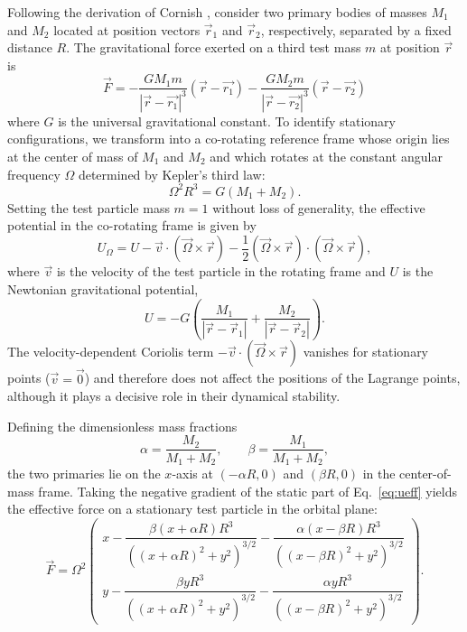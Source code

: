 \documentclass[12pt, letterpaper]{article}
\begin{document}
Following the derivation of Cornish \cite{cornish}, consider two primary bodies of masses $M_1$ and $M_2$ located at position vectors $\vec{r}_1$ and $\vec{r}_2$, respectively, separated by a fixed distance $R$. The gravitational force exerted on a third test mass $m$ at position $\vec{r}$ is
$$ 
\vec{F}
= -\frac{GM_1m}{|\vec{r}-\vec{r_1}|^3} (\vec{r}-\vec{r_1})
-\frac{GM_2m}{|\vec{r}-\vec{r_2}|^3} (\vec{r}-\vec{r_2})
$$
where $G$ is the universal gravitational constant. To identify stationary configurations, we transform into a co-rotating reference frame whose origin lies at the center of mass of $M_1$ and $M_2$ and which rotates at the constant angular frequency $\Omega$ determined by Kepler's third law:
$$
\Omega^2 R^3 = G(M_1 + M_2).
$$
Setting the test particle mass $m = 1$ without loss of generality, the effective potential in the co-rotating frame is given by
\begin{equation}
U_\Omega = U - 
\vec{v} \cdot (\vec{\Omega} \times \vec{r}) -
\frac{1}{2}(\vec{\Omega} \times \vec{r})\cdot(\vec{\Omega} \times \vec{r}),
\label{eq:ueff}
\end{equation}
where $\vec{v}$ is the velocity of the test particle in the rotating frame and $U$ is the Newtonian gravitational potential,
$$
U = -G\left(\frac{M_1}{|\vec{r} - \vec{r}_1|} + \frac{M_2}{|\vec{r} - \vec{r}_2|}\right).
$$
The velocity-dependent Coriolis term $-\vec{v} \cdot (\vec{\Omega} \times \vec{r})$ vanishes for stationary points ($\vec{v} = \vec{0}$) and therefore does not affect the positions of the Lagrange points, although it plays a decisive role in their dynamical stability.

Defining the dimensionless mass fractions
$$
\alpha = \frac{M_2}{M_1 + M_2}, \qquad \beta = \frac{M_1}{M_1 + M_2},
$$
the two primaries lie on the $x$-axis at $(-\alpha R, 0)$ and $(\beta R, 0)$ in the center-of-mass frame. Taking the negative gradient of the static part of Eq.~\eqref{eq:ueff} yields the effective force on a stationary test particle in the orbital plane:
\begin{equation}
\vec{F} = \Omega^2
\begin{pmatrix}
x - \dfrac{\beta(x + \alpha R)R^3}{\left((x + \alpha R)^2 + y^2\right)^{3/2}} - \dfrac{\alpha(x - \beta R)R^3}{\left((x - \beta R)^2 + y^2\right)^{3/2}} \\[14pt]
y - \dfrac{\beta y R^3}{\left((x + \alpha R)^2 + y^2\right)^{3/2}} - \dfrac{\alpha y R^3}{\left((x - \beta R)^2 + y^2\right)^{3/2}}
\end{pmatrix}.
\label{eq:feff}
\end{equation}
\end{document}
